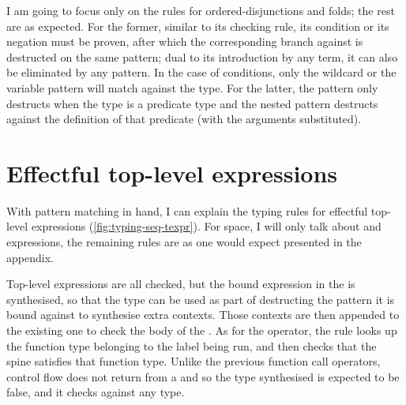 I am going to focus only on the rules for ordered-disjunctions and folds; the
rest are as expected. For the former, similar to its checking rule, its
condition or its negation must be proven, after which the corresponding branch
against is destructed on the same pattern; dual to its introduction by any
term, it can also be eliminated by any pattern. In the case of
 conditions, only the wildcard or the variable pattern
will match against the type. For the latter, the pattern only destructs when
the type is a predicate type and the nested pattern destructs against the
definition of that predicate (with the arguments substituted).

\section{Effectful top-level expressions}

With pattern matching in hand, I can explain the typing rules for effectful
top-level expressions (\cref{fig:typing-seq-texpr}). For space, I will
only talk about  and  expressions, %
the remaining rules are as one would expect presented in the appendix.

Top-level expressions are all checked, but the bound expression in the
 is synthesised, so that the type can be used as part of
destructing the pattern it is bound against to synthesise extra contexts. Those
contexts are then appended to the existing one to check the body of the
. As for the  operator, the rule %
looks up the function type belonging to the label being run, and then checks
that the spine satisfies that function type. Unlike the previous function call
operators, control flow does not return from a  %
and so the type synthesised is expected to be false, and it checks against any
type.

